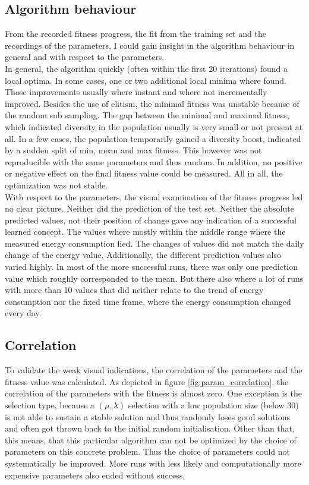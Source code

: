 \documentclass[conference]{IEEEtran}
\begin{document}
\subsection{Algorithm behaviour}
From the recorded fitness progress, the fit from the training set and the recordings of the parameters, I could gain insight in the algorithm behaviour in general and with respect to the parameters.\\
In general, the algorithm quickly (often within the first 20 iterations) found a local optima. In some cases, one or two additional local minima where found. Those improvements usually where instant and where not incrementally improved. Besides the use of elitism, the minimal fitness was unstable because of the random sub sampling. The gap between the minimal and maximal fitness, which indicated diversity in the population usually is very small or not present at all. In a few cases, the population temporarily gained a diversity boost, indicated by a sudden split of min, mean and max fitness. This however was not reproducible with the same parameters and thus random. In addition, no positive or negative effect on the final fitness value could be measured. All in all, the optimization was not stable.\\
With respect to the parameters, the visual examination of the fitness progress led no clear picture. Neither did the prediction of the test set. Neither the absolute predicted values, not their position of change gave any indication of a successful learned concept. The values where mostly within the middle range where the measured energy consumption lied. The changes of values did not match the daily change of the energy value. Additionally, the different prediction values also varied highly. In most of the more successful runs, there was only one prediction value which roughly corresponded to the mean. But there also where a lot of runs with more than 10 values that did neither relate to the trend of energy consumption nor the fixed time frame, where the energy consumption changed every day.



\subsection{Correlation}
To validate the weak visual indications, the correlation of the parameters and the fitness value was calculated. As depicted in figure \ref{fig:param_correlation}, the correlation of the parameters with the fitness is almost zero. One exception is the selection type, because a $(\mu,\lambda)$ selection with a low population size (below 30) is not able to sustain a stable solution and thus randomly loses good solutions and often got thrown back to the initial random initialisation. Other than that, this means, that this particular algorithm can not be optimized by the choice of parameters on this concrete problem. Thus the choice of parameters could not systematically be improved. More runs with less likely and computationally more expensive parameters also ended without success.\\
\end{document}
